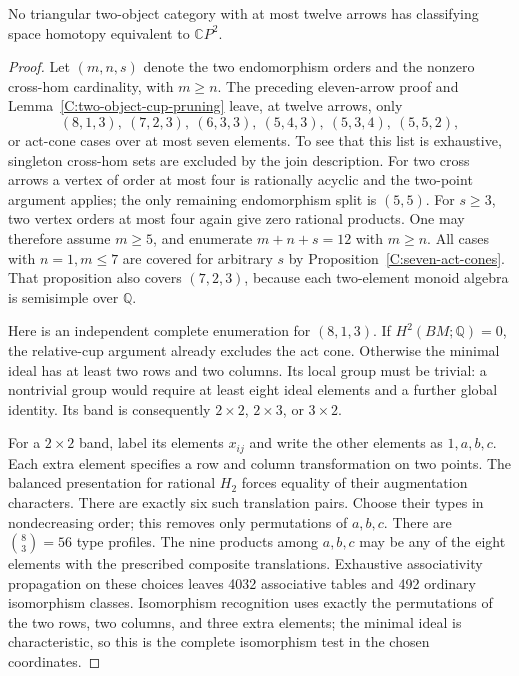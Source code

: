 \begin{lemma}\label{C:twelve-triangular}
No triangular two-object category with at most twelve arrows has
classifying space homotopy equivalent to $\mathbb CP^2$.
\end{lemma}
\begin{proof}
Let $(m,n,s)$ denote the two endomorphism orders and the nonzero
cross-hom cardinality, with $m\geq n$. The preceding eleven-arrow
proof and Lemma~\ref{C:two-object-cup-pruning} leave, at twelve arrows,
only
\[
 (8,1,3),\ (7,2,3),\ (6,3,3),\ (5,4,3),\
 (5,3,4),\ (5,5,2),
\]
or act-cone cases over at most seven elements. To see that this list
is exhaustive, singleton cross-hom sets are excluded by the join
description. For two cross arrows a vertex of order at most four
is rationally acyclic and the two-point argument applies; the only
remaining endomorphism split is $(5,5)$. For $s\geq3$, two vertex
orders at most four again give zero rational products. One may
therefore assume $m\geq5$, and enumerate $m+n+s=12$ with $m\geq n$.
All cases with $n=1,m\leq7$ are covered for arbitrary $s$ by
Proposition~\ref{C:seven-act-cones}. That proposition also covers
$(7,2,3)$, because each two-element monoid algebra is semisimple
over $\mathbb Q$.

Here is an independent complete enumeration for $(8,1,3)$.
If $H^2(BM;\mathbb Q)=0$, the relative-cup argument already
excludes the act cone. Otherwise the minimal ideal has at least
two rows and two columns. Its local group must be trivial: a
nontrivial group would require at least eight ideal elements and
a further global identity. Its band is consequently $2\times2$,
$2\times3$, or $3\times2$.

For a $2\times2$ band, label its elements $x_{ij}$ and write the
other elements as $1,a,b,c$. Each extra element specifies a row
and column transformation on two points. The balanced presentation
for rational $H_2$ forces equality of their augmentation characters.
There are exactly six such translation pairs. Choose their types
in nondecreasing order; this removes only permutations of $a,b,c$.
There are $\binom{8}{3}=56$ type profiles. The nine products among
$a,b,c$ may be any of the eight elements with the prescribed
composite translations. Exhaustive associativity propagation on
these choices leaves 4032 associative tables and 492 ordinary
isomorphism classes. Isomorphism recognition uses exactly the
permutations of the two rows, two columns, and three extra elements;
the minimal ideal is characteristic, so this is the complete
isomorphism test in the chosen coordinates.


\end{proof}
